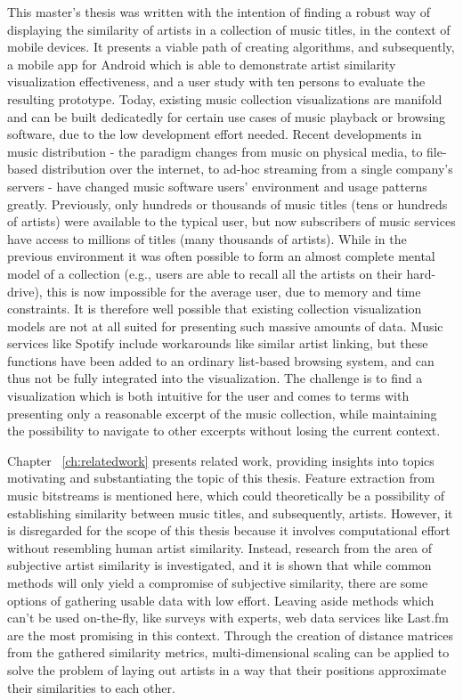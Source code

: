 This master's thesis was written with the intention of finding a robust way of displaying the similarity of artists in a collection of music titles, in the context of mobile devices. It presents a viable path of creating algorithms, and subsequently, a mobile app for Android which is able to demonstrate artist similarity visualization effectiveness, and a user study with ten persons to evaluate the resulting prototype.
Today, existing music collection visualizations are manifold and can be built dedicatedly for certain use cases of music playback or browsing software, due to the low development effort needed. Recent developments in music distribution - the paradigm changes from music on physical media, to file-based distribution over the internet, to ad-hoc streaming from a single company's servers - have changed music software users' environment and usage patterns greatly. Previously, only hundreds or thousands of music titles (tens or hundreds of artists) were available to the typical user, but now subscribers of music services have access to millions of titles (many thousands of artists). While in the previous environment it was often possible to form an almost complete mental model of a collection (e.g., users are able to recall all the artists on their hard-drive), this is now impossible for the average user, due to memory and time constraints. It is therefore well possible that existing collection visualization models are not at all suited for presenting such massive amounts of data. Music services like Spotify include workarounds like similar artist linking, but these functions have been added to an ordinary list-based browsing system, and can thus not be fully integrated into the visualization. The challenge is to find a visualization which is both intuitive for the user and comes to terms with presenting only a reasonable excerpt of the music collection, while maintaining the possibility to navigate to other excerpts without losing the current context.

Chapter ~\ref{ch:relatedwork} presents related work, providing insights into topics motivating and substantiating the topic of this thesis. Feature extraction from music bitstreams is mentioned here, which could theoretically be a possibility of establishing similarity between music titles, and subsequently, artists. However, it is disregarded for the scope of this thesis because it involves computational effort without resembling human artist similarity. Instead, research from the area of subjective artist similarity is investigated, and it is shown that while common methods will only yield a compromise of subjective similarity, there are some options of gathering usable data with low effort. Leaving aside methods which can't be used on-the-fly, like surveys with experts, web data services like Last.fm are the most promising in this context. Through the creation of distance matrices from the gathered similarity metrics, multi-dimensional scaling can be applied to solve the problem of laying out artists in a way that their positions approximate their similarities to each other.

